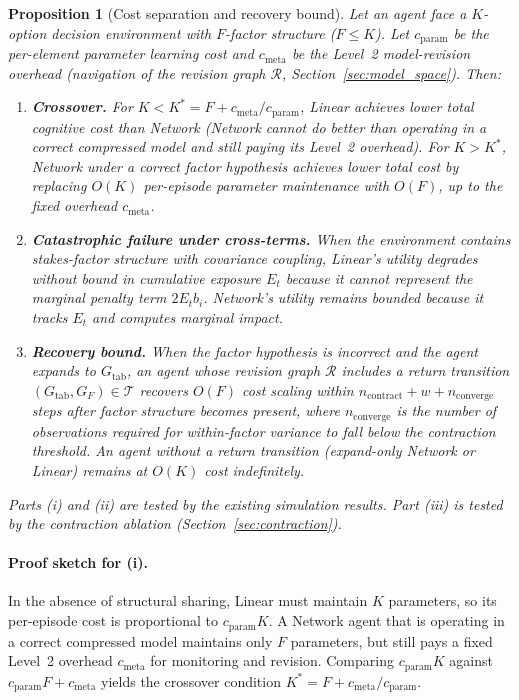 \documentclass[11pt]{article}
\newtheorem{proposition}{Proposition}
\begin{document}
\begin{proposition}[Cost separation and recovery bound]\label{prop:crossover}
Let an agent face a $K$-option decision environment with $F$-factor structure
($F \leq K$).  Let $c_{\mathrm{param}}$ be the per-element parameter learning
cost and $c_{\mathrm{meta}}$ be the Level~2 model-revision overhead (navigation
of the revision graph $\mathcal{R}$, Section~\ref{sec:model_space}).  Then:

\begin{enumerate}[label=(\roman*)]
\item \textbf{Crossover.}
For $K < K^* = F + c_{\mathrm{meta}}/c_{\mathrm{param}}$, Linear achieves lower
total cognitive cost than Network (Network cannot do better than operating in a
correct compressed model and still paying its Level~2 overhead).
For $K > K^*$, Network under a correct factor hypothesis achieves lower total
cost by replacing $O(K)$ per-episode parameter maintenance with $O(F)$, up to the
fixed overhead $c_{\mathrm{meta}}$.

\item \textbf{Catastrophic failure under cross-terms.}
When the environment contains stakes-factor structure with covariance coupling,
Linear's utility degrades without bound in cumulative exposure $E_t$ because it
cannot represent the marginal penalty term $2E_t b_i$.  Network's utility
remains bounded because it tracks $E_t$ and computes marginal impact.

\item \textbf{Recovery bound.}
When the factor hypothesis is incorrect and the agent expands to
$G_{\mathrm{tab}}$, an agent whose revision graph $\mathcal{R}$ includes a
return transition $(G_{\mathrm{tab}}, G_F) \in \mathcal{T}$ recovers $O(F)$ cost
scaling within $n_{\mathrm{contract}} + w + n_{\mathrm{converge}}$ steps after
factor structure becomes present, where $n_{\mathrm{converge}}$ is the number of
observations required for within-factor variance to fall below the contraction
threshold.  An agent without a return transition (expand-only Network or Linear)
remains at $O(K)$ cost indefinitely.
\end{enumerate}

Parts (i) and (ii) are tested by the existing simulation results.
Part (iii) is tested by the contraction ablation
(Section~\ref{sec:contraction}).
\end{proposition}

\paragraph{Proof sketch for (i).}
In the absence of structural sharing, Linear must maintain $K$ parameters, so
its per-episode cost is proportional to $c_{\mathrm{param}}K$.  A Network agent
that is operating in a correct compressed model maintains only $F$ parameters,
but still pays a fixed Level~2 overhead $c_{\mathrm{meta}}$ for monitoring and
revision.  Comparing $c_{\mathrm{param}}K$ against $c_{\mathrm{param}}F +
c_{\mathrm{meta}}$ yields the crossover condition $K^* = F +
c_{\mathrm{meta}}/c_{\mathrm{param}}$.
\end{document}
